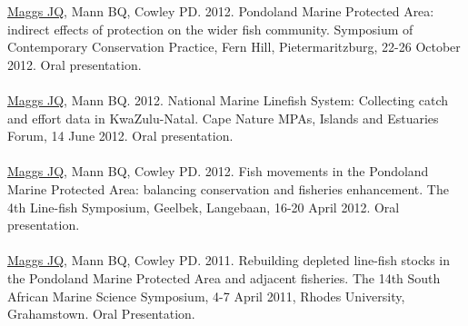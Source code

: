 \documentclass[10pt,a4paper]{article}
\begin{document}
\underline{Maggs JQ}, Mann BQ, Cowley PD. 2012. Pondoland Marine Protected Area: indirect effects of protection on the wider fish community. Symposium of Contemporary Conservation Practice, Fern Hill, Pietermaritzburg, 22-26 October 2012. Oral presentation.\\
\\
\underline{Maggs JQ}, Mann BQ. 2012. National Marine Linefish System: Collecting catch and effort data in KwaZulu-Natal. Cape Nature MPAs, Islands and Estuaries Forum, 14 June 2012. Oral presentation.\\ 
\\
\underline{Maggs JQ}, Mann BQ, Cowley PD. 2012. Fish movements in the Pondoland Marine Protected Area: balancing conservation and fisheries enhancement. The 4th Line-fish Symposium, Geelbek, Langebaan, 16-20 April 2012. Oral presentation.\\
\\
\underline{Maggs JQ}, Mann BQ, Cowley PD. 2011. Rebuilding depleted line-fish stocks in the Pondoland Marine Protected Area and adjacent fisheries. The 14th South African Marine Science Symposium, 4-7 April 2011, Rhodes University, Grahamstown. Oral Presentation.
\end{document}
